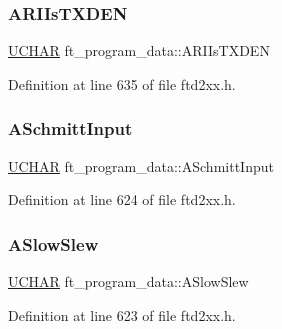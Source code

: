 \subsubsection{\texorpdfstring{A\+R\+I\+Is\+T\+X\+D\+EN}{ARIIsTXDEN}}
{\footnotesize\ttfamily \hyperlink{CatCaloProto40MHz_2inc_2WinTypes_8h_a4f4bb67531a9bf6f0b9c6ad76aeba587}{U\+C\+H\+AR} ft\+\_\+program\+\_\+data\+::\+A\+R\+I\+Is\+T\+X\+D\+EN}



Definition at line 635 of file ftd2xx.\+h.

\mbox{\label{structft__program__data_a2cd876ddaa004af5561f546ee142ba5c}} 
\subsubsection{\texorpdfstring{A\+Schmitt\+Input}{ASchmittInput}}
{\footnotesize\ttfamily \hyperlink{CatCaloProto40MHz_2inc_2WinTypes_8h_a4f4bb67531a9bf6f0b9c6ad76aeba587}{U\+C\+H\+AR} ft\+\_\+program\+\_\+data\+::\+A\+Schmitt\+Input}



Definition at line 624 of file ftd2xx.\+h.

\mbox{\label{structft__program__data_ac9bd84862d8950749f28dde07688a2dd}} 
\subsubsection{\texorpdfstring{A\+Slow\+Slew}{ASlowSlew}}
{\footnotesize\ttfamily \hyperlink{CatCaloProto40MHz_2inc_2WinTypes_8h_a4f4bb67531a9bf6f0b9c6ad76aeba587}{U\+C\+H\+AR} ft\+\_\+program\+\_\+data\+::\+A\+Slow\+Slew}



Definition at line 623 of file ftd2xx.\+h.

\mbox{\label{structft__program__data_a09d5d7234d1be0ac5d30a0a215dfd717}} 
